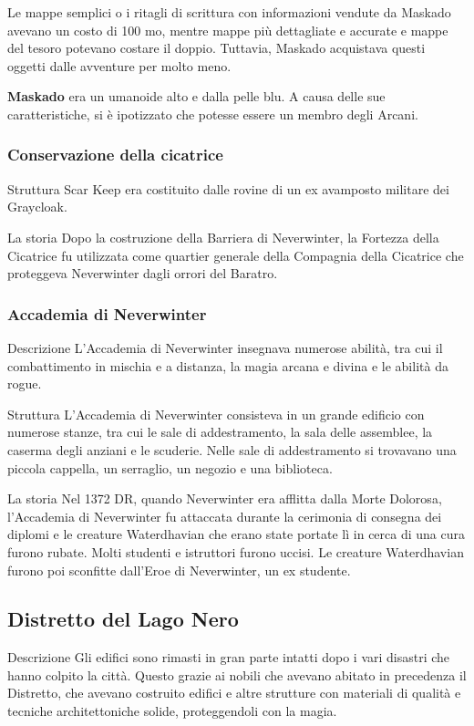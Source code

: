 \documentclass{article}
\begin{document}
Le mappe semplici o i ritagli di scrittura con informazioni vendute da Maskado avevano un costo di 100 mo, mentre mappe più dettagliate e accurate e mappe del tesoro potevano costare il doppio. Tuttavia, Maskado acquistava questi oggetti dalle avventure per molto meno.

\textbf{Maskado} era un umanoide alto e dalla pelle blu. A causa delle sue caratteristiche, si è ipotizzato che potesse essere un membro degli Arcani.

              \subsubsection{Conservazione della cicatrice}
Struttura
Scar Keep era costituito dalle rovine di un ex avamposto militare dei Graycloak.

La storia
Dopo la costruzione della Barriera di Neverwinter, la Fortezza della Cicatrice fu utilizzata come quartier generale della Compagnia della Cicatrice che proteggeva Neverwinter dagli orrori del Baratro.
              \subsubsection{Accademia di Neverwinter}
Descrizione
L'Accademia di Neverwinter insegnava numerose abilità, tra cui il combattimento in mischia e a distanza, la magia arcana e divina e le abilità da rogue.

Struttura
L'Accademia di Neverwinter consisteva in un grande edificio con numerose stanze, tra cui le sale di addestramento, la sala delle assemblee, la caserma degli anziani e le scuderie. Nelle sale di addestramento si trovavano una piccola cappella, un serraglio, un negozio e una biblioteca.

La storia
Nel 1372 DR, quando Neverwinter era afflitta dalla Morte Dolorosa, l'Accademia di Neverwinter fu attaccata durante la cerimonia di consegna dei diplomi e le creature Waterdhavian che erano state portate lì in cerca di una cura furono rubate. Molti studenti e istruttori furono uccisi. Le creature Waterdhavian furono poi sconfitte dall'Eroe di Neverwinter, un ex studente.
          \subsection{Distretto del Lago Nero}
Descrizione
Gli edifici sono rimasti in gran parte intatti dopo i vari disastri che hanno colpito la città. Questo grazie ai nobili che avevano abitato in precedenza il Distretto, che avevano costruito edifici e altre strutture con materiali di qualità e tecniche architettoniche solide, proteggendoli con la magia.
\end{document}
